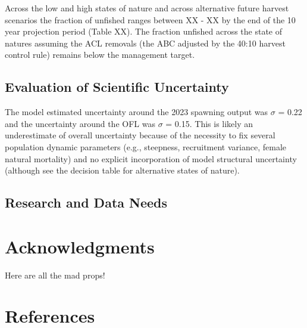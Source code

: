 \documentclass[11pt,
  english,
  letterpaper,
]{article}
\begin{document}
Across the low and high states of nature and across alternative future harvest scenarios the fraction of unfished ranges between XX - XX by the end of the 10 year projection period (Table XX). The fraction unfished across the state of natures assuming the ACL removals (the ABC adjusted by the 40:10 harvest control rule) remains below the management target.

\hypertarget{evaluation-of-scientific-uncertainty}{%
\subsection{Evaluation of Scientific Uncertainty}\label{evaluation-of-scientific-uncertainty}}

The model estimated uncertainty around the 2023 spawning output was \(\sigma\) = 0.22 and the uncertainty around the OFL was \(\sigma\) = 0.15. This is likely an underestimate of overall uncertainty because of the necessity to fix several population dynamic parameters (e.g., steepness, recruitment variance, female natural mortality) and no explicit incorporation of model structural uncertainty (although see the decision table for alternative states of nature).

\hypertarget{research-and-data-needs-1}{%
\subsection{Research and Data Needs}\label{research-and-data-needs-1}}

\hypertarget{acknowledgments}{%
\section{Acknowledgments}\label{acknowledgments}}

Here are all the mad props!

\clearpage

\hypertarget{references}{%
\section{References}\label{references}}
\end{document}
